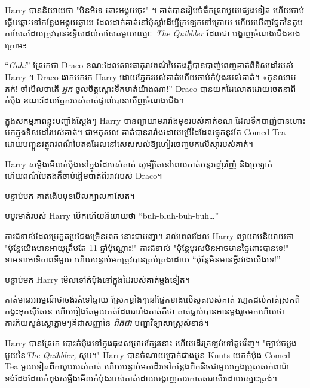 Harry បាននិយាយថា "មិនអីទេ តោះអង្គុយចុះ" ។ គាត់​បាន​រៀប​ចំ​ផឹក​ស្រា​មួយ​ផ្សេង​ទៀត ហើយ​ចាប់​ផ្តើម​ឆ្ពោះ​ទៅ​កន្លែង​អង្គុយ​ឆ្ងាយ ដែល​ដាក់​គាត់​នៅ​មុំ​ស្តាំ​ដើម្បី​ក្រឡេក​ទៅ​ក្រោយ ហើយ​ឃើញ​ផ្នែក​នៃ​តូប​កាសែត​ដែល​ត្រូវ​បាន​ឧទ្ទិស​ដល់​កាសែត​មួយ​ឈ្មោះ \emph{The Quibbler} ដែល​ជា បង្ហាញចំណងជើងខាងក្រោម៖


“\emph{Gah!}” ស្រែកថា Draco ខណៈដែលសារធាតុរាវពណ៌បៃតងភ្លឺបានបាញ់ពេញគាត់ពីទិសដៅរបស់ Harry ។ Draco ងាកមករក Harry ដោយភ្នែករបស់គាត់ហើយចាប់កំប៉ុងរបស់គាត់។ «កូន​ឈាម​ភក់! ចាំមើលថាតើ \emph{អ្នក} ចូលចិត្តស្ដោះទឹកមាត់យ៉ាងណា!” Draco បាន​យក​ដៃ​លោត​ដោយ​ចេតនា​ពី​កំប៉ុង ខណៈ​ដែល​ភ្នែក​របស់​គាត់​ផ្ទាល់​បាន​ឃើញ​ចំណងជើង។

ក្នុង​សកម្មភាព​ឆ្លុះ​បញ្ចាំង​ស្តែងៗ Harry បាន​ព្យាយាម​រារាំង​មុខ​របស់​គាត់​ខណៈ​ដែល​ទឹក​បាញ់​បាន​ហោះ​មក​ក្នុង​ទិសដៅ​របស់​គាត់។ ជាអកុសល គាត់បានរារាំងដោយប្រើដៃដែលផ្ទុកនូវតែ Comed-Tea ដោយបញ្ជូនវត្ថុរាវពណ៌បៃតងដែលនៅសេសសល់ឱ្យហៀរចេញមកលើស្មារបស់គាត់។

Harry សម្លឹងមើលកំប៉ុងនៅក្នុងដៃរបស់គាត់ សូម្បីតែនៅពេលគាត់បន្តរញ៉េរញ៉ៃ និងប្រឡាក់ ហើយពណ៌បៃតងក៏ចាប់ផ្តើមបាត់ពីអាវរបស់ Draco។

បន្ទាប់​មក គាត់​ងើប​មុខ​មើល​ក្បាល​កាសែត។


បបូរមាត់របស់ Harry បើកហើយនិយាយថា “buh-bluh-buh-buh…”

ការជំទាស់ដែលប្រកួតប្រជែងច្រើនពេក នោះជាបញ្ហា។ រាល់ពេលដែល Harry ព្យាយាមនិយាយថា "ប៉ុន្តែយើងមានអាយុត្រឹមតែ 11 ឆ្នាំប៉ុណ្ណោះ!" ការជំទាស់ "ប៉ុន្តែបុរសមិនអាចមានផ្ទៃពោះបានទេ!" ទាមទារ​អាទិភាព​ទី​មួយ ហើយ​បន្ទាប់​មក​ត្រូវ​បាន​គ្រប់គ្រង​ដោយ “ប៉ុន្តែ​មិន​មាន​អ្វី​រវាង​យើង​ទេ!”

បន្ទាប់មក Harry មើលទៅកំប៉ុងនៅក្នុងដៃរបស់គាត់ម្តងទៀត។

គាត់មានអារម្មណ៍ថាចង់រត់ទៅឆ្ងាយ ស្រែកខ្លាំងៗនៅផ្នែកខាងលើសួតរបស់គាត់ រហូតដល់គាត់ស្រកពីកង្វះអុកស៊ីសែន ហើយរឿងតែមួយគត់ដែលរារាំងគាត់គឺថា គាត់ធ្លាប់បានអានម្តងរួចមកហើយថា ការភ័យស្លន់ស្លោភ្លាមៗគឺជាសញ្ញានៃ \emph{ ពិតជា } បញ្ហាវិទ្យាសាស្ត្រសំខាន់។

Harry បាន​ស្រែក បោះ​កំប៉ុង​ទៅ​ក្នុង​ធុង​សម្រាម​ក្បែរ​នោះ ហើយ​ដើរ​ត្រឡប់​ទៅ​តូប​វិញ។ "ច្បាប់ចម្លងមួយនៃ\emph{The Quibbler,} សូម។" Harry បានចំណាយប្រាក់ជាងបួន Knuts យកកំប៉ុង Comed-Tea មួយទៀតពីកាបូបរបស់គាត់ ហើយបន្ទាប់មកដើរទៅកន្លែងពិកនិចជាមួយក្មេងប្រុសសក់ពណ៌ទង់ដែងដែលកំពុងសម្លឹងមើលកំប៉ុងរបស់គាត់ដោយបង្ហាញការកោតសរសើរដោយស្មោះត្រង់។

